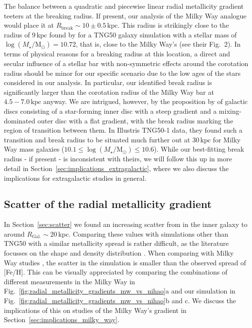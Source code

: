 \documentclass[fleqn,usenatbib]{mnras}
\begin{document}
The balance between a quadratic and piecewise linear radial metallicity gradient teeters at the breaking radius. If present, our analysis of the Milky Way analogue would place it at $R_\mathrm{break} \sim 10 \pm 0.5\,\mathrm{kpc}$. This radius is strikingly close to the radius of $9\,\mathrm{kpc}$ found by \citet{Hemler2021} for a TNG50 galaxy simulation with a stellar mass of $\log(M_\star/\mathrm{M_\odot}) = 10.72$, that is, close to the Milky Way's (see their Fig.~2). In terms of physical reasons for a breaking radius at this location, a direct and secular influence of a stellar bar with non-symmetric effects around the corotation radius \citep{DiMatteo2013, Scarano2013} should be minor for our specific scenario due to the low ages of the stars considered in our analysis. In particular, our identified break radius is significantly larger than the corotation radius of the Milky Way bar at $4.5-7.0\,\mathrm{kpc}$ \citep[][and references therein]{BlandHawthorn_Gerhard2016} anyway. We are intrigued, however, by the proposition by \citet{Garcia2023} of galactic discs consisting of a star-forming inner disc with a steep gradient and a mixing-dominated outer disc with a flat gradient, with the break radius marking the region of transition between them. In Illustris TNG50-1 data, they found such a transition and break radius to be situated much further out at $30\,\mathrm{kpc}$ for Milky Way mass galaxies ($10.1 \leq \log(M_\star/\mathrm{M_\odot}) \leq 10.6$). While our best-fitting break radius - if present - is inconsistent with theirs, we will follow this up in more detail in Section~\ref{sec:implications_extragalactic}, where we also discuss the implications for extragalactic studies in general.

\subsection{Scatter of the radial metallicity gradient} \label{sec:discussion_scatter}

In Section~\ref{sec:scatter} we found an increasing scatter from  in the inner galaxy to  around $R_\mathrm{Gal.} \sim 20\,\mathrm{kpc}$. Comparing these values with simulations other than TNG50 with a similar metallicity spread \citep[see Fig.~2 by][]{Hemler2021} is rather difficult, as the literature focusses on the shape and density distribution \citep[see e.g.][their Fig.~10]{Minchev2014b}. When comparing with Milky Way studies \citep[e.g.][]{Anders2017}, the scatter in the simulation is smaller than the observed spread of [Fe/H]. This can be visually appreciated by comparing the combinations of different measurements in the Milky Way \citep{Genovali2014, Spina2021, Myers2022} in Fig.~\ref{fig:radial_metallicity_gradients_mw_vs_nihao}a and our simulation in Fig.~\ref{fig:radial_metallicity_gradients_mw_vs_nihao}b and c. We discuss the implications of this on studies of the Milky Way's gradient in Section~\ref{sec:implications_milky_way}.
\end{document}
